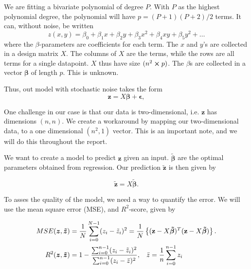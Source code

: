 \documentclass[reprint,english,notitlepage,aps,nobalancelastpage,nofootinbib]{revtex4-1}  %
\newcommand{\vc}[1]{\mathbf{#1}}
\begin{document}
We are fitting a bivariate polynomial of degree $P$. With $P$ as the highest polynomial degree, the polynomial will have $p=(P+1)(P+2) / 2$ terms. It can, without noise, be written
\begin{equation}\label{eq:zpolynm}
	z(x, y) = \beta_0 + \beta_1x + \beta_2y + \beta_3x^2 + \beta_4xy + \beta_5y^2 + \dots
\end{equation}
where the $\beta$-parameters are coefficients for each term. The $x$ and $y$'s are collected in a design matrix $X$. The columns of $X$ are the terms, while the rows are all terms for a single datapoint. $X$ thus have size $(n^2\cross p)$. The $\beta$s are collected in a vector $\boldsymbol{\beta}$ of length $p$. This is unknown.

Thus, out model with stochastic noise takes the form
\begin{equation}
	\label{eq:z_true_data}
	\vc{z} = X \boldsymbol{\beta} + \boldsymbol{\epsilon},
\end{equation}

One challenge in our case is that our data is two-dimensional, i.e. $\vc{z}$ has dimensions $(n,n)$. We create a workaround by mapping our two-dimensional data, to a one dimensional $(n^2,1)$ vector. This is an important note, and we will do this throughout the report.

We want to create a model to predict $\vc{z}$ given an input. $\boldsymbol{\tilde\beta}$ are the optimal parameters obtained from regression. Our prediction \(\boldsymbol{\tilde{\vc{z}}}\) is then given by

\begin{equation*}
	\boldsymbol{\tilde{z}} = X\boldsymbol{\tilde{\beta}}.
\end{equation*}

To asses the quality of the model, we need a way to quantify the error. We will use the mean square error (MSE), and $R^2$-score, given by

{\large
\begin{align*}
	MSE(\boldsymbol{z}, \boldsymbol{\tilde{z}}) &= \frac{1}{N}\sum_{i=0}^{N-1} (z_i - \tilde{z}_i)^2 = \frac{1}{N}\left\{(\vc{z} - X\boldsymbol{\tilde{\beta}})^T(\vc{z} - X\boldsymbol{\tilde{\beta}})\right\}.
	\\
	R^2(\boldsymbol{z}, \boldsymbol{\tilde{z}}) &= 1 - \frac{\sum_{i=0}^{n-1}(z_i - \tilde{z}_i)^2}{\sum_{i=0}^{n-1}(z_i - \bar{z})^2}, \hspace{3mm} \bar{z} = \frac{1}{n}\sum_{i=0}^{n-1}z_i
\end{align*}
}%
\end{document}

